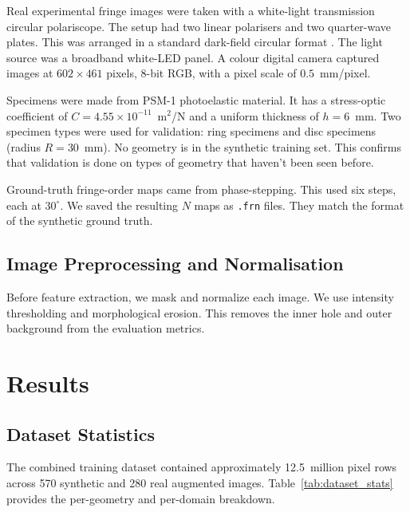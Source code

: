 \documentclass[review,12pt]{elsarticle}
\begin{document}
Real experimental fringe images were taken with a white-light transmission circular polariscope. The setup had two linear polarisers and two quarter-wave plates. This was arranged in a standard dark-field circular format \cite{dally1991,ramesh2000}. The light source was a broadband white-LED panel. A colour digital camera captured images at $602 \times 461$ pixels, 8-bit RGB, with a pixel scale of $0.5$~mm/pixel.

Specimens were made from PSM-1 photoelastic material. It has a stress-optic coefficient of $C = 4.55 \times 10^{-11}$~m$^2$/N and a uniform thickness of $h = 6$~mm. Two specimen types were used for validation: ring specimens and disc specimens (radius $R = 30$~mm). No geometry is in the synthetic training set. This confirms that validation is done on types of geometry that haven't been seen before.

Ground-truth fringe-order maps came from phase-stepping. This used six steps, each at $30^\circ$. We saved the resulting $N$ maps as \texttt{.frn} files. They match the format of the synthetic ground truth.

\subsection{Image Preprocessing and Normalisation}
\label{sec:preprocessing}

Before feature extraction, we mask and normalize each image. We use intensity thresholding and morphological erosion. This removes the inner hole and outer background from the evaluation metrics.

\FloatBarrier
\section{Results}
\label{sec:results}

\subsection{Dataset Statistics}

The combined training dataset contained approximately 12.5~million pixel
rows across 570 synthetic and 280 real augmented images.
Table~\ref{tab:dataset_stats} provides the per-geometry and per-domain
breakdown.
\end{document}
